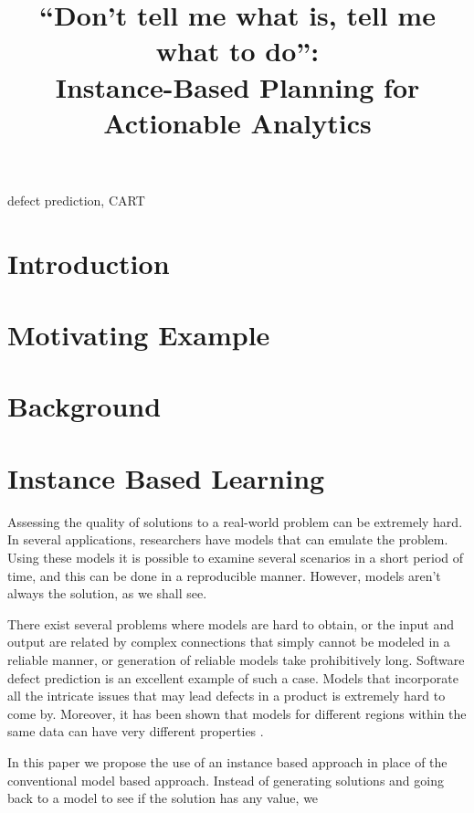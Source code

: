 \documentclass[conference]{IEEEtran}
\begin{document}
  \title{``Don't tell me what is, tell me what to do'':\\Instance-Based Planning for Actionable Analytics}
  
  \maketitle
  
  
  \begin{abstract}
 
  \end{abstract}
  \begin{IEEEkeywords}
    defect prediction, CART
  \end{IEEEkeywords}
  
\section{Introduction}
\section{Motivating Example}
\section{Background}
\section{Instance Based Learning}

Assessing the quality of solutions to a real-world problem can be extremely hard. In several applications, researchers have models that can emulate the problem. Using these models it is possible to examine several scenarios in a short period of time, and this can be done in a reproducible manner. However, models aren't always the solution, as we shall see. 

There exist several problems where models are hard to obtain, or the input and output are related by complex connections that simply cannot be modeled in a reliable manner, or generation of reliable models take prohibitively long. Software defect prediction is an excellent example of such a case. Models that incorporate all the intricate issues that may lead defects in a product is extremely hard to come by. Moreover, it has been shown that models for different regions within the same data can have very different properties \cite{localvsglobal}. 

In this paper we propose the use of an instance based approach in place of the conventional model based approach. Instead of generating solutions and going back to a model to see if the solution has any value, we 
\end{document}
